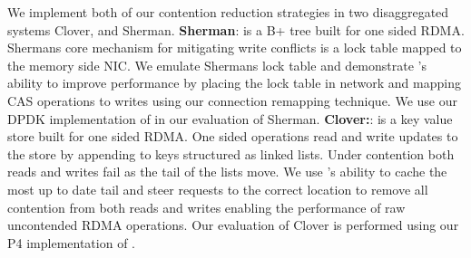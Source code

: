 We implement both of our contention reduction strategies in
two disaggregated systems Clover, and Sherman. 
\textbf{Sherman}: is a B+ tree built for one sided RDMA.
Shermans core mechanism for mitigating write conflicts is a
lock table mapped to the memory side NIC. We emulate
Shermans lock table and demonstrate \sword's ability to
improve performance by placing the lock table in network and
mapping CAS operations to writes using our connection
remapping technique. We use our DPDK implementation of
\sword in our evaluation of Sherman.
\textbf{Clover:}: is a key value store built for one sided
RDMA. One sided operations read and write updates to the
store by appending to keys structured as linked lists. Under
contention both reads and writes fail as the tail of the
lists move. We use \sword's ability to cache the most up to
date tail and steer requests to the correct location to
remove all contention from both reads and writes enabling
the performance of raw uncontended RDMA operations. Our
evaluation of Clover is performed using our P4
implementation of \sword.





